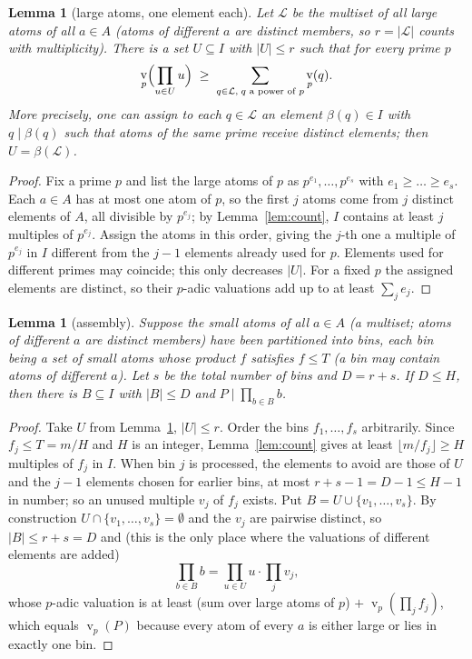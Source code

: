 \documentclass[11pt]{article}
\newtheorem{lemma}[theorem]{Lemma}
\theoremstyle{definition}
\DeclareMathOperator{\vp}{v}
\begin{document}
\begin{lemma}[large atoms, one element each]\label{lem:large}
Let $\mathcal L$ be the multiset of all large atoms of all $a\in A$ (atoms of different $a$ are distinct
members, so $r=|\mathcal L|$ counts with multiplicity). There is a \emph{set} $U\subseteq I$ with $|U|\le r$
such that for every prime $p$
\[
 \vp_p\Bigl(\prod_{u\in U}u\Bigr)\;\ge\;\sum_{q\in\mathcal L,\;q\text{ a power of }p}\vp_p(q).
\]
More precisely, one can assign to each $q\in\mathcal L$ an element $\beta(q)\in I$ with $q\mid\beta(q)$ such
that atoms of the same prime receive distinct elements; then $U=\beta(\mathcal L)$.
\end{lemma}
\begin{proof}
Fix a prime $p$ and list the large atoms of $p$ as $p^{e_1},\dots,p^{e_s}$ with $e_1\ge\dots\ge e_s$. Each
$a\in A$ has at most one atom of $p$, so the first $j$ atoms come from $j$ distinct elements of $A$, all
divisible by $p^{e_j}$; by Lemma~\ref{lem:count}, $I$ contains at least $j$ multiples of $p^{e_j}$. Assign the
atoms in this order, giving the $j$-th one a multiple of $p^{e_j}$ in $I$ different from the $j-1$ elements
already used for $p$. Elements used for different primes may coincide; this only decreases $|U|$. For a
fixed $p$ the assigned elements are distinct, so their $p$-adic valuations add up to at least $\sum_j e_j$.
\end{proof}

\begin{lemma}[assembly]\label{lem:assembly}
Suppose the small atoms of all $a\in A$ (a multiset; atoms of different $a$ are distinct members) have been
partitioned into \emph{bins}, each bin being a set of small atoms whose product $f$ satisfies $f\le T$ (a bin may
contain atoms of different $a$). Let $s$ be the total number of bins and
$D=r+s$. If $D\le H$, then there is $B\subseteq I$ with $|B|\le D$ and $P\mid\prod_{b\in B}b$.
\end{lemma}
\begin{proof}
Take $U$ from Lemma~\ref{lem:large}, $|U|\le r$. Order the bins $f_1,\dots,f_s$ arbitrarily. Since
$f_j\le T=m/H$ and $H$ is an integer, Lemma~\ref{lem:count} gives at least $\lfloor m/f_j\rfloor\ge H$ multiples of
$f_j$ in $I$.
When bin $j$ is processed, the elements to avoid are those of $U$ and the $j-1$ elements chosen for earlier
bins, at most $r+s-1=D-1\le H-1$ in number; so an unused multiple $v_j$ of $f_j$ exists. Put
$B=U\cup\{v_1,\dots,v_s\}$. By construction $U\cap\{v_1,\dots,v_s\}=\emptyset$ and the $v_j$ are pairwise
distinct, so $|B|\le r+s=D$ and (this is the only place where the valuations of different elements are added)
\[
 \prod_{b\in B}b=\prod_{u\in U}u\cdot\prod_{j}v_j ,
\]
whose $p$-adic valuation is at least (sum over large atoms of $p$) $+\;\vp_p(\prod_j f_j)$, which equals
$\vp_p(P)$ because every atom of every $a$ is either large or lies in exactly one bin.
\end{proof}
\end{document}
